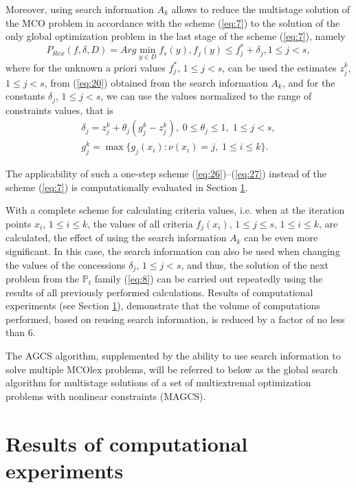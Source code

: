 \documentclass[smallextended]{svjour3}       %
\begin{document}
Moreover, using search information $A_k$ allows to reduce the multistage solution of the MCO problem in accordance with the scheme (\ref{eq:7}) to the solution of the only global optimization problem in the last stage of the scheme (\ref{eq:7}), namely 
\begin{equation}\label{eq:26}
P_{\delta lex} (f,\delta,D)=Arg \min_{y\in D}{f_s(y)}, f_j(y)\leq f_j^*+\delta_j, 1 \leq j < s,
\end{equation}
where for the unknown a priori values $f_j^*$, $1 \leq j < s$, can be used the estimates $z_j^k$, $1 \leq j < s$, from (\ref{eq:20}) obtained from the search information $A_k$,  and for the constants $\delta_j$, $1 \leq j<s$, we can use the values normalized to the range of constraints values, that is
\begin{equation}\label{eq:27}
	\begin{matrix}
	\delta_j=z_j^k+\theta_j (g_j^k-z_j^k ),\; 0\leq \theta_j\leq 1, \; 1 \leq j < s,\\
	g_j^k= \max{\{ g_j (x_i ) : \nu(x_i)=j,\; 1\leq i\leq k \}}.
	\end{matrix}
\end{equation}

The applicability of such a one-step scheme (\ref{eq:26})--(\ref{eq:27}) instead of the scheme (\ref{eq:7}) is computationally evaluated in Section \ref{sec:4}.

With a complete scheme for calculating criteria values, i.e. when at the iteration points $x_i$, $1 \leq i \leq k$,  the values of all criteria $f_j (x_i)$, $1 \leq j \leq s$, $1 \leq i \leq k$, are calculated, the effect of using the search information $A_k$ can be even more significant. In this case, the search information can also be used when changing the values of the concessions $\delta_j$, $1 \leq j < s$, and thus, the solution of the next problem from the $\mathbb{P}_t$ family (\ref{eq:8}) can be carried out repeatedly using the results of all previously performed calculations. Results of computational experiments (see Section \ref{sec:4}), demonstrate that the volume of computations performed, based on reusing search information, is reduced by a factor of no less than 6.

The AGCS algorithm, supplemented by the ability to use search information to solve multiple MCOlex  problems, will be referred to below as the global search algorithm for multistage solutions of a set of multiextremal optimization problems with nonlinear constraints (MAGCS).

\section{Results of computational experiments}
\label{sec:4}
\end{document}
